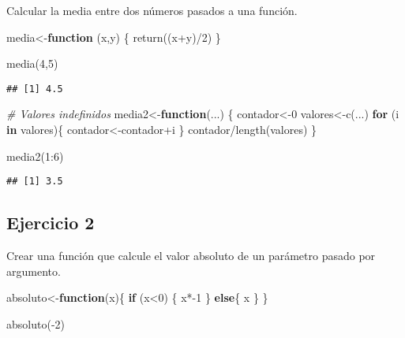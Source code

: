\documentclass[
]{article}
\newenvironment{Shaded}{\begin{snugshade}}{\end{snugshade}}
\newcommand{\CommentTok}[1]{\textcolor[rgb]{0.56,0.35,0.01}{\textit{#1}}}
\newcommand{\ControlFlowTok}[1]{\textcolor[rgb]{0.13,0.29,0.53}{\textbf{#1}}}
\newcommand{\DecValTok}[1]{\textcolor[rgb]{0.00,0.00,0.81}{#1}}
\newcommand{\FunctionTok}[1]{\textcolor[rgb]{0.00,0.00,0.00}{#1}}
\newcommand{\NormalTok}[1]{#1}
\newcommand{\OtherTok}[1]{\textcolor[rgb]{0.56,0.35,0.01}{#1}}
\newcommand{\SpecialCharTok}[1]{\textcolor[rgb]{0.00,0.00,0.00}{#1}}
\begin{document}
Calcular la media entre dos números pasados a una función.

\begin{Shaded}
\begin{Highlighting}[]
\NormalTok{media}\OtherTok{\textless{}{-}}\ControlFlowTok{function}\NormalTok{ (x,y) \{}
  \FunctionTok{return}\NormalTok{((x}\SpecialCharTok{+}\NormalTok{y)}\SpecialCharTok{/}\DecValTok{2}\NormalTok{)}
\NormalTok{\}}

\FunctionTok{media}\NormalTok{(}\DecValTok{4}\NormalTok{,}\DecValTok{5}\NormalTok{)}
\end{Highlighting}
\end{Shaded}

\begin{verbatim}
## [1] 4.5
\end{verbatim}

\begin{Shaded}
\begin{Highlighting}[]
\CommentTok{\# Valores indefinidos}
\NormalTok{media2}\OtherTok{\textless{}{-}}\ControlFlowTok{function}\NormalTok{(...) \{}
\NormalTok{  contador}\OtherTok{\textless{}{-}}\DecValTok{0}
\NormalTok{  valores}\OtherTok{\textless{}{-}}\FunctionTok{c}\NormalTok{(...)}
  \ControlFlowTok{for}\NormalTok{ (i }\ControlFlowTok{in}\NormalTok{ valores)\{}
\NormalTok{    contador}\OtherTok{\textless{}{-}}\NormalTok{contador}\SpecialCharTok{+}\NormalTok{i}
\NormalTok{  \}}
\NormalTok{ contador}\SpecialCharTok{/}\FunctionTok{length}\NormalTok{(valores) }
\NormalTok{\}}

\FunctionTok{media2}\NormalTok{(}\DecValTok{1}\SpecialCharTok{:}\DecValTok{6}\NormalTok{)}
\end{Highlighting}
\end{Shaded}

\begin{verbatim}
## [1] 3.5
\end{verbatim}

\hypertarget{ejercicio-2-1}{%
\subsection{Ejercicio 2}\label{ejercicio-2-1}}

Crear una función que calcule el valor absoluto de un parámetro pasado
por argumento.

\begin{Shaded}
\begin{Highlighting}[]
\NormalTok{absoluto}\OtherTok{\textless{}{-}}\ControlFlowTok{function}\NormalTok{(x)\{}
  \ControlFlowTok{if}\NormalTok{ (x}\SpecialCharTok{\textless{}}\DecValTok{0}\NormalTok{) \{}
\NormalTok{    x}\SpecialCharTok{*{-}}\DecValTok{1}
\NormalTok{  \} }\ControlFlowTok{else}\NormalTok{\{}
\NormalTok{    x}
\NormalTok{  \}}
\NormalTok{\}}

\FunctionTok{absoluto}\NormalTok{(}\SpecialCharTok{{-}}\DecValTok{2}\NormalTok{)}
\end{Highlighting}
\end{Shaded}
\end{document}

